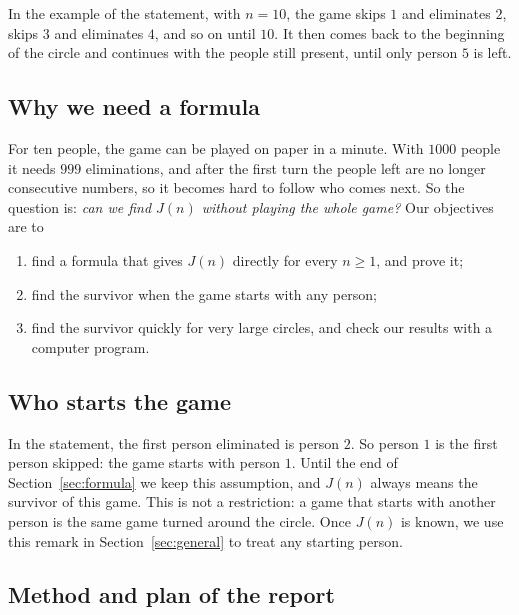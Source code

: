 In the example of the statement, with $n=10$, the game skips $1$ and
eliminates $2$, skips $3$ and eliminates $4$, and so on until $10$. It then
comes back to the beginning of the circle and continues with the people still
present, until only person $5$ is left.

\subsection{Why we need a formula}

For ten people, the game can be played on paper in a minute. With $1000$
people it needs $999$ eliminations, and after the first turn the people left
are no longer consecutive numbers, so it becomes hard to follow who comes
next. So the question is: \emph{can we find $J(n)$ without playing the whole
game?} Our objectives are to
\begin{enumerate}
  \item find a formula that gives $J(n)$ directly for every $n\geq1$, and prove
        it;
  \item find the survivor when the game starts with any person;
  \item find the survivor quickly for very large circles, and check our
        results with a computer program.
\end{enumerate}

\subsection{Who starts the game}\label{sec:assumption}

In the statement, the first person eliminated is person $2$. So person $1$ is
the first person skipped: the game starts with person $1$. Until the end of
Section~\ref{sec:formula} we keep this assumption, and $J(n)$ always means the
survivor of this game. This is not a restriction: a game that starts with
another person is the same game turned around the circle. Once $J(n)$ is
known, we use this remark in Section~\ref{sec:general} to treat any starting
person.

\subsection{Method and plan of the report}

